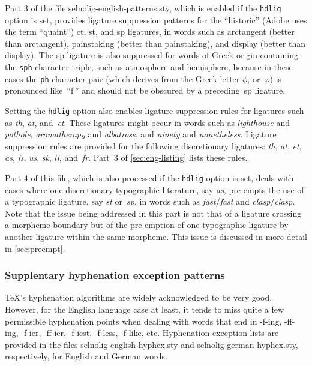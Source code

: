 \documentclass[12pt]{article}
\newcommand{\pkg}[1]{\textsf{#1}}
\newcommand{\opt}[1]{\texttt{#1}}
\begin{document}
Part 3 of the file \pkg{selnolig-english-patterns.sty}, which is enabled if the \opt{hdlig} option is set, provides ligature suppression patterns for the \enquote{historic} (Adobe uses the term \enquote{quaint}) \mbox{ct}, \mbox{st}, and \mbox{sp} ligatures, in words such as arctangent (better than ar\mbox{ct}angent), painstaking (better than pain\mbox{st}aking), and display (better than di\mbox{sp}lay). The sp ligature is also suppressed for words of Greek origin containing the \opt{sph} character triple, such as atmosphere and hemisphere, because in these cases the \opt{ph} character pair (which derives from the Greek letter $\phi$, or~$\varphi$) is pronounced like~\enquote{f\,} and should not be obscured by a preceding~sp ligature.

Setting the \opt{hdlig} option also enables ligature suppression rules for ligatures such as \emph{th}, \emph{at}, and~\emph{et}. These ligatures might occur in words such as \emph{ligh\mbox{th}ouse} and \emph{po\mbox{th}ole}, \emph{arom\mbox{at}herapy} and \emph{alb\mbox{at}ross}, and \emph{nin\mbox{et}y} and \emph{non\mbox{et}heless}. Ligature suppression rules are provided for the following discretionary ligatures: \emph{th}, \emph{at}, \emph{et}, \emph{as}, \emph{is}, \emph{us}, {\ebg \emph{sk}},  \emph{ll}, and~\emph{fr}. Part~3 of \cref{sec:eng-listing} lists these rules.

Part 4 of this file, which is also processed if the \opt{hdlig} option is set, deals with cases where one discretionary typographic literature, say \emph{as}, pre-empts the use of a typographic ligature, say \emph{st} or~\emph{sp}, in words such as \emph{f\mbox{as}t}\slash \emph{fa\mbox{st}} and \emph{cl\mbox{as}p}\slash \emph{cla\mbox{sp}}. Note that the issue being addressed in this part is not that of a ligature crossing a morpheme boundary but of the pre-emption of one typographic ligature by another ligature within the same morpheme. This issue is discussed in more detail in \cref{sec:preempt}.



\subsubsection{Supplentary hyphenation exception patterns} \label{sec:addlhyph}

\TeX's hyphenation algorithms are widely acknowledged to be very good. However, for the English language case at least, it tends to miss quite a few permissible hyphenation points when dealing with words that end in -f-ing, -ff-ing, -f-ier, -ff-ier, -f-iest, -f-less, -f-like, etc. Hyphenation exception lists are provided in the files \pkg{selnolig-english-hyphex.sty} and \pkg{selnolig-german-hyphex.sty}, respectively, for English and German words.
\end{document}
